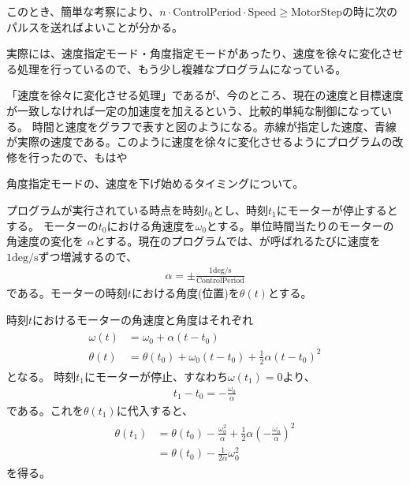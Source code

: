 \documentclass[letterpaper,10pt,dvipdfmx]{sphinxmanual}
\begin{document}
このとき、簡単な考察により、\(n\cdot\mathrm{ControlPeriod}\cdot\mathrm{Speed}\ge\mathrm{MotorStep}\)の時に次のパルスを送ればよいことが分かる。

実際には、速度指定モード・角度指定モードがあったり、速度を徐々に変化させる処理を行っているので、もう少し複雑なプログラムになっている。

「速度を徐々に変化させる処理」であるが、今のところ、現在の速度と目標速度が一致しなければ一定の加速度を加えるという、比較的単純な制御になっている。
時間と速度をグラフで表すと図のようになる。赤線が指定した速度、青線が実際の速度である。このように速度を徐々に変化させるようにプログラムの改修を行ったので、もはや


角度指定モードの、速度を下げ始めるタイミングについて。

プログラムが実行されている時点を時刻\(t_0\)とし、時刻\(t_1\)にモーターが停止するとする。 モーターの\(t_0\)における角速度を\(\omega_0\)とする。単位時間当たりのモーターの角速度の変化を \(\alpha\)とする。現在のプログラムでは、が呼ばれるたびに速度を\(1 \mathrm{deg/s}\)ずつ増減するので、
\begin{equation*}
\begin{split}\alpha=\pm\frac{1 \mathrm{deg/s}}{\mathrm{ControlPeriod}}
\end{split}
\end{equation*}
である。モーターの時刻\(t\)における角度(位置)を\(\theta(t)\)とする。

時刻\(t\)におけるモーターの角速度と角度はそれぞれ
\begin{equation*}
\begin{split}\begin{aligned}
\omega(t)&=\omega_0+\alpha(t-t_0) \\
\theta(t)&=\theta(t_0)+\omega_0(t-t_0)+\frac{1}{2}\alpha(t-t_0)^2\end{aligned}
\end{split}
\end{equation*}
となる。 時刻\(t_1\)にモーターが停止、すなわち\(\omega(t_1)=0\)より、
\begin{equation*}
\begin{split}t_1-t_0=-\frac{\omega_0}{\alpha}
\end{split}
\end{equation*}
である。これを\(\theta(t_1)\)に代入すると、
\begin{equation*}
\begin{split}\begin{aligned}
\theta(t_1)&=\theta(t_0)-\frac{\omega_0^2}{\alpha}
+\frac{1}{2}\alpha\left(-\frac{\omega_0}{\alpha}\right)^2 \\
&=\theta(t_0)-\frac{1}{2\alpha}\omega_0^2\end{aligned}
\end{split}
\end{equation*}
を得る。
\end{document}
